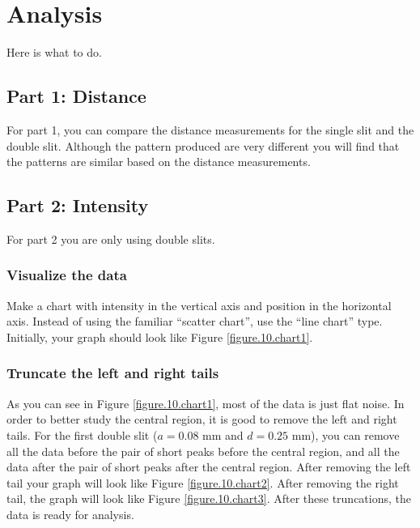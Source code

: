 \section{Analysis}
Here is what to do.
\subsection{Part 1: Distance}
For part 1, you can compare the distance measurements for the single slit and the double slit. Although the pattern produced are very different you will find that the patterns are similar based on the distance measurements.
\subsection{Part 2: Intensity}
For part 2 you are only using double slits.
\subsubsection{Visualize the data}
Make a chart with intensity in the vertical axis and position in the horizontal axis. Instead of using the familiar ``scatter chart'', use the ``line chart'' type. Initially, your graph should look like Figure \ref{figure.10.chart1}.
\subsubsection{Truncate the left and right tails}
As you can see in Figure \ref{figure.10.chart1}, most of the data is just flat noise. In order to better study the central region, it is good to remove the left and right tails. For the first double slit ($a = 0.08$ mm and $d = 0.25$ mm), you can remove all the data before the pair of short peaks before the central region, and all the data after the pair of short peaks after the central region. After removing the left tail your graph will look like Figure \ref{figure.10.chart2}. After removing the right tail, the graph will look like Figure \ref{figure.10.chart3}. After these truncations, the data is ready for analysis.

